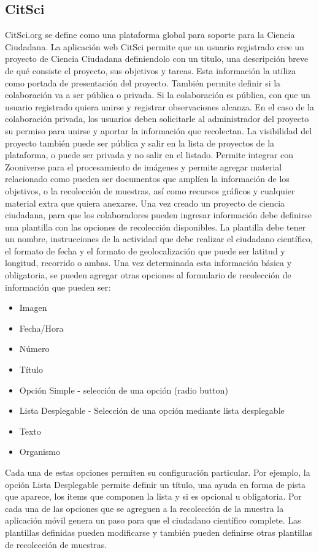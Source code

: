 \subsection{CitSci}
CitSci.org \cite{citsci} se define como una plataforma global para soporte para la Ciencia Ciudadana. La aplicación web CitSci permite que un usuario registrado cree un proyecto de Ciencia Ciudadana definiendolo con un título, una descripción breve de qué consiste el proyecto, sus objetivos y tareas. Esta información la utiliza como portada de presentación del proyecto. También permite definir si la colaboración va a ser pública o privada. Si la colaboración es pública, con que un usuario registrado quiera unirse y registrar observaciones alcanza. En el caso de la colaboración privada, los usuarios deben solicitarle al administrador del proyecto su permiso para unirse y aportar la información que recolectan. La visibilidad del proyecto también puede ser pública y salir en la lista de proyectos de la plataforma, o puede ser privada y no salir en el listado. Permite integrar con Zooniverse para el procesamiento de imágenes y permite agregar material relacionado como pueden ser documentos que amplíen la información de los objetivos, o la recolección de muestras, así como recursos gráficos y cualquier material extra que quiera anexarse.
Una vez creado un proyecto de ciencia ciudadana, para que los colaboradores pueden ingresar información debe definirse una plantilla con las opciones de recolección disponibles. La plantilla debe tener un nombre, instrucciones de la actividad que debe realizar el ciudadano científico, el formato de fecha y el formato de geolocalización que puede ser latitud y longitud, recorrido o ambas. Una vez determinada esta información básica y obligatoria, se pueden agregar otras opciones al formulario de recolección de información que pueden ser:
			\begin{itemize}
				\item Imagen
				\item Fecha/Hora
				\item Número
				\item Título
				\item Opción Simple - selección de una opción (radio button)
				\item Lista Desplegable - Selección de una opción mediante lista desplegable
				\item Texto
				\item Organismo 
			\end{itemize}
Cada una de estas opciones permiten su configuración particular. Por ejemplo, la opción Lista Desplegable permite definir un título, una ayuda en forma de pista que aparece, los items que componen la lista y si es opcional u obligatoria. Por cada una de las opciones que se agreguen a la recolección de la muestra la aplicación móvil genera un paso para que el ciudadano científico complete. Las plantillas definidas pueden modificarse y también pueden definirse otras plantillas de recolección de muestras.					 
